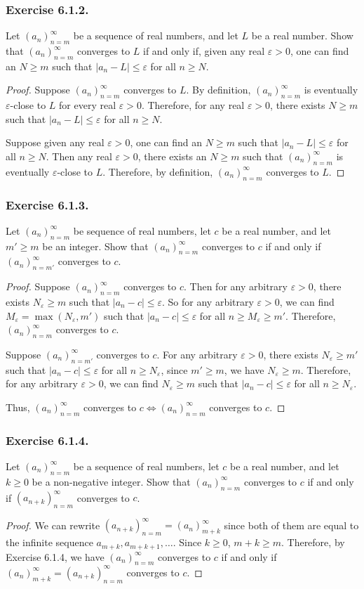 \documentclass[12pt, letter]{article}
\newcommand{\an}{(a_n)_{n=m}^\infty}
\begin{document}
\subsubsection*{Exercise 6.1.2.}
Let $(a_n)_{n=m}^\infty$ be a sequence of real numbers, and let $L$ be a real number. Show that $\an$ converges to $L$ if and only if, given any real $\varepsilon>0$,
one can find an $N\geq m$ such that $|a_n-L|\leq \varepsilon$ for all $n\geq N$.
\begin{proof}
    Suppose $\an$ converges to $L$. By definition, $\an$ is eventually $\varepsilon$-close to $L$ for every real $\varepsilon>0$. Therefore, for any real $\varepsilon>0$,
    there exists $N\geq m$ such that $|a_n-L|\leq\varepsilon$ for all $n\geq N$.

    Suppose given any real $\varepsilon>0$, one can find an $N\geq m$ such that $|a_n-L|\leq \varepsilon$ for all $n\geq N$. Then any real $\varepsilon>0$, 
    there exists an $N\geq m$ such that $\an$ is eventually $\varepsilon$-close to $L$. Therefore, by definition, $\an$ converges to $L$.
\end{proof}
\subsubsection*{Exercise 6.1.3.}
Let $\an$ be sequence of real numbers, let $c$ be a real number, and let $m'\geq m$ be an integer. Show that $\an$ converges to $c$ if and only if $(a_n)_{n=m'}^\infty$ converges
to $c$.
\begin{proof}
    Suppose $\an$ converges to $c$. Then for any arbitrary $\varepsilon>0$, there exists $N_{\varepsilon}\geq m$ such that $|a_n-c|\leq \varepsilon$. So for any arbitrary $\varepsilon>0$,
    we can find $M_\varepsilon=\max(N_\varepsilon, m')$ such that $|a_n-c|\leq\varepsilon$ for all $n\geq M_\varepsilon\geq m'$. Therefore, $(a_n)_{n=m}^\infty$ converges to $c$.

    Suppose $(a_n)_{n=m'}^\infty$ converges to $c$. For any arbitrary $\varepsilon>0$, there exists $N_{\varepsilon}\geq m'$ such that $|a_n-c|\leq \varepsilon$ for all $n\geq N_\varepsilon$,
    since $m'\geq m$, we have $N_\varepsilon\geq m$.  Therefore, for any arbitrary $\varepsilon>0$, we can find $N_{\varepsilon}\geq m$ such that $|a_n-c|\leq \varepsilon$ for all $n\geq N_\varepsilon$.
    
    Thus, $\an$ converges to $c\iff (a_n)_{n=m}^\infty$ converges to $c$.
\end{proof}
\subsubsection*{Exercise 6.1.4.}
Let $\an$ be a sequence of real numbers, let $c$ be a real number,  and let $k\geq 0$ be a non-negative integer. Show that $\an$ converges to $c$
if and only if $(a_{n+k})_{n=m}^\infty$ converges to $c$.
\begin{proof}
    We can rewrite $(a_{n+k})_{n=m}^\infty=(a_n)_{m+k}^\infty$ since both of them are equal to the infinite sequence $a_{m+k},a_{m+k+1},\dotsc$. Since 
    $k\geq 0$, $m+k\geq m$. Therefore, by Exercise 6.1.4, we have $\an$ converges to $c$ if and only if $(a_n)_{m+k}^\infty=(a_{n+k})_{n=m}^\infty$ converges to $c$. 
\end{proof}
\end{document}
